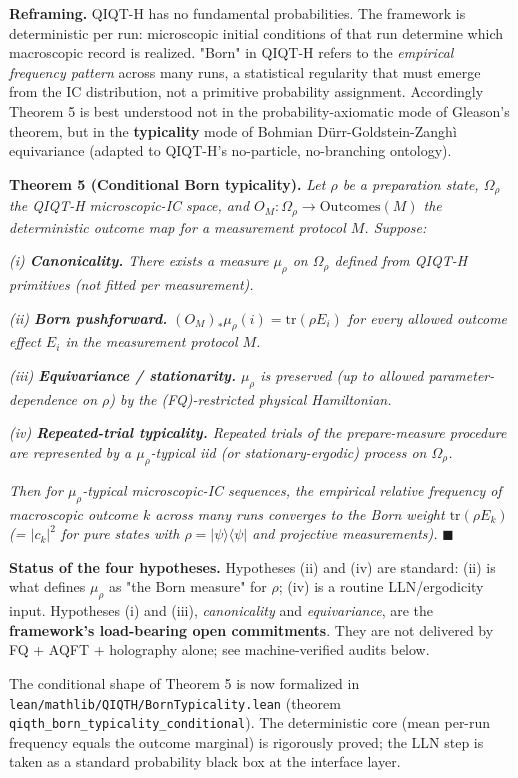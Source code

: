 \documentclass[11pt,a4paper]{article}
\begin{document}
\textbf{Reframing.} QIQT-H has no fundamental probabilities. The framework is deterministic per run: microscopic initial conditions of that run determine which macroscopic record is realized. "Born" in QIQT-H refers to the \emph{empirical frequency pattern} across many runs, a statistical regularity that must emerge from the IC distribution, not a primitive probability assignment. Accordingly Theorem 5 is best understood not in the probability-axiomatic mode of Gleason's theorem, but in the \textbf{typicality} mode of Bohmian Dürr-Goldstein-Zanghì equivariance (adapted to QIQT-H's no-particle, no-branching ontology).

\textbf{Theorem 5 (Conditional Born typicality).} \emph{Let $\rho$ be a preparation state, $\Omega_\rho$ the QIQT-H microscopic-IC space, and $O_M : \Omega_\rho \to \mathrm{Outcomes}(M)$ the deterministic outcome map for a measurement protocol $M$. Suppose:}

\emph{(i) \textbf{Canonicality.} There exists a measure $\mu_\rho$ on $\Omega_\rho$ defined from QIQT-H primitives (not fitted per measurement).}

\emph{(ii) \textbf{Born pushforward.} $(O_M)_* \mu_\rho(i) = \mathrm{tr}(\rho E_i)$ for every allowed outcome effect $E_i$ in the measurement protocol $M$.}

\emph{(iii) \textbf{Equivariance / stationarity.} $\mu_\rho$ is preserved (up to allowed parameter-dependence on $\rho$) by the (FQ)-restricted physical Hamiltonian.}

\emph{(iv) \textbf{Repeated-trial typicality.} Repeated trials of the prepare-measure procedure are represented by a $\mu_\rho$-typical iid (or stationary-ergodic) process on $\Omega_\rho$.}

\emph{Then for $\mu_\rho$-typical microscopic-IC sequences, the empirical relative frequency of macroscopic outcome $k$ across many runs converges to the Born weight $\mathrm{tr}(\rho E_k)$ (= $|c_k|^2$ for pure states with $\rho = |\psi\rangle\langle\psi|$ and projective measurements).} $\blacksquare$

\textbf{Status of the four hypotheses.} Hypotheses (ii) and (iv) are standard: (ii) is what defines $\mu_\rho$ as "the Born measure" for $\rho$; (iv) is a routine LLN/ergodicity input. Hypotheses (i) and (iii), \emph{canonicality} and \emph{equivariance}, are the \textbf{framework's load-bearing open commitments}. They are not delivered by FQ + AQFT + holography alone; see machine-verified audits below.

The conditional shape of Theorem 5 is now formalized in \texttt{lean/mathlib/QIQTH/BornTypicality.lean} (theorem \texttt{qiqth\_born\_typicality\_conditional}). The deterministic core (mean per-run frequency equals the outcome marginal) is rigorously proved; the LLN step is taken as a standard probability black box at the interface layer.
\end{document}
